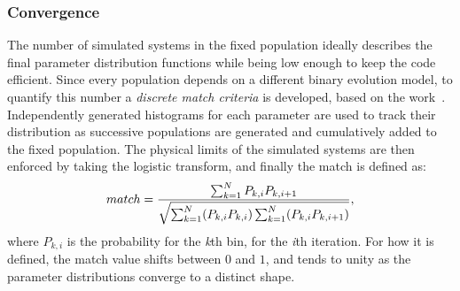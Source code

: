 \subsubsection{Convergence}
The number of simulated systems in the fixed population ideally describes the final parameter distribution functions while being low enough to keep the code efficient. 
Since every population depends on a different binary evolution model, to quantify this number a \textit{discrete match criteria} is developed, based on the work~\cite{Chatziioannou17}.
Independently generated histograms for each parameter are used to track their distribution as successive populations are generated and cumulatively added to the fixed population.
The physical limits of the simulated systems are then enforced by taking the logistic transform, and finally the match is defined as: 
\begin{equation}
    match=\displaystyle\frac{\sum_{k=1}^{N}P_{k,i} P_{k,i+1}}{\sqrt{\sum_{k=1}^{N}(P_{k,i}P_{k,i})\sum_{k=1}^{N}(P_{k,i}P_{k,i+1})}},
    \notag
\end{equation}
where $P_{k,i}$ is the probability for the \textit{k}th bin, for the \textit{i}th iteration.
For how it is defined, the match value shifts between $0$ and $1$, and tends to unity as the parameter distributions converge to a distinct shape.

